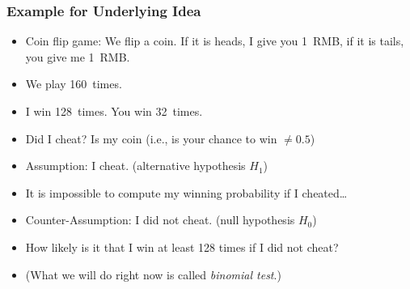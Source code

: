 \documentclass[aspectratio=169,mathserif,notheorems]{beamer}%
\begin{document}
\begin{frame}[t]\frametitle{Example for Underlying Idea}%
%
%
%
%
\begin{itemize}%
\item<1-> Coin flip game: We flip a coin. If it is heads, I give you 1~RMB, if it is tails, you give me 1~RMB.%
\item<3-> We play 160~times.%
\item<4-> I win 128~times. You win 32~times.%
%
\item<6-> Did I cheat? Is my coin  (i.e., is your chance to win $\neq0.5$)%
\item<7-> \alert<6>{Assumption: I cheat.} (alternative hypothesis $H_1$)%
\item<8-> It is impossible to compute my winning probability if I cheated\dots%
\item<9-> \alert<7>{Counter-Assumption: I did not cheat.} (null hypothesis $H_0$)%
%
\item<10-> How likely is it that I win \alert{at least} 128 times if I did \alert{not} cheat?%
\item<11-> (What we will do right now is called \emph{binomial test}.)%
\end{itemize}%
\end{frame}%
%
%
\end{document}
